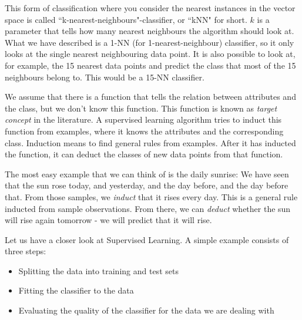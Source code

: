 \documentclass[10pt,a4paper]{article}
\begin{document}
This form of classification where you consider the nearest instances in the vector space is called ``k-nearest-neighbours"-classifier, or ``kNN" for short. $k$ is a parameter that tells how many nearest neighbours the algorithm should look at. What we have described is a 1-NN (for 1-nearest-neighbour) classifier, so it only looks at the single nearest neighbouring data point. It is also possible to look at, for example, the 15 nearest data points and predict the class that most of the 15 neighbours belong to. This would be a 15-NN classifier.

We assume that there is a function that tells the relation between attributes and the class, but we don't know this function. This function is known as \textit{target concept} in the literature. A supervised learning algorithm tries to induct this function from examples, where it knows the attributes and the corresponding class. Induction means to find general rules from examples. After it has inducted the function, it can deduct the classes of new data points from that function.

The most easy example that we can think of is the daily sunrise: We have seen that the sun rose today, and yesterday, and the day before, and the day before that. From those samples, we \textit{induct} that it rises every day. This is a general rule inducted from sample observations. From there, we can \textit{deduct} whether the sun will rise again tomorrow - we will predict that it will rise.

Let us have a closer look at Supervised Learning. A simple example consists of three steps:
\begin{itemize}
\item Splitting the data into training and test sets
\item Fitting the classifier to the data
\item Evaluating the quality of the classifier for the data we are dealing with
\end{itemize}
\end{document}
